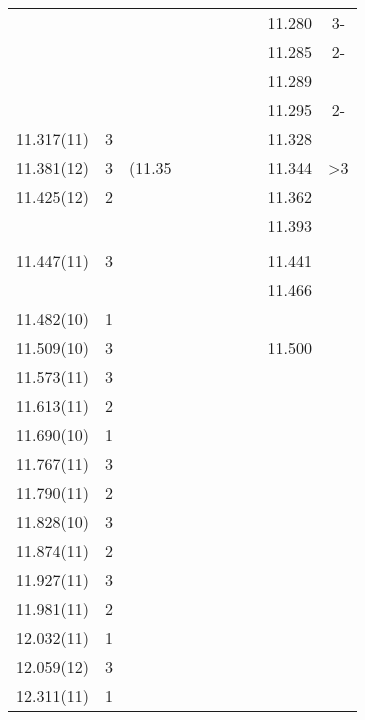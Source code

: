 \begin{landscape}
\begin{center}
\begin{longtable}{cc cc cc cc cc}
  &   &   &   &   &   &   &   & 11.280  & 3-  \\
  &   &   &   &   &   &   &   & 11.285  & 2-  \\
  &   &   &   &   &   &   &   & 11.289  &   \\
  &   &   &   &   &   &   &   & 11.295  & 2-  \\
    11.317(11)    & 3 &   &   &   &   &   &   & 11.328  &   \\
    11.381(12)    & 3 & (11.35  &   &   &   &   &   & 11.344  & >3  \\
    11.425(12)    & 2 &   &   &   &   &   &   & 11.362  &   \\
  &   &   &   &   &   &   &   & 11.393  &   \\
  &   &   &   &   &   &   &   &   &   \\
    11.447(11)    & 3 &   &   &   &   &   &   & 11.441  &   \\
  &   &   &   &   &   &   &   & 11.466  &   \\
    11.482(10)    & 1 &   &   &   &   &   &   &   &   \\
    11.509(10)    & 3 &   &   &   &   &   &   & 11.500  &   \\
     11.573(11)   & 3 &   &   &   &   &   &   &   &   \\
     11.613(11)   & 2 &   &   &   &   &   &   &   &   \\
   11.690(10)     & 1 &   &   &   &   &   &   &   &   \\
   11.767(11)     & 3 &   &   &   &   &   &   &   &   \\
   11.790(11)     & 2 &   &   &   &   &   &   &   &   \\
   11.828(10)     & 3 &   &   &   &   &   &   &   &   \\
     11.874(11)   & 2 &   &   &   &   &   &   &   &   \\
    11.927(11)    & 3 &   &   &   &   &   &   &   &   \\
    11.981(11)    & 2 &   &   &   &   &   &   &   &   \\
     12.032(11)   & 1 &   &   &   &   &   &   &   &   \\
     12.059(12)   & 3 &   &   &   &   &   &   &   &   \\
    12.311(11)    & 1 &   &   &   &   &   &   &   &   \\



    \end{longtable}
\end{center}
\end{landscape}


